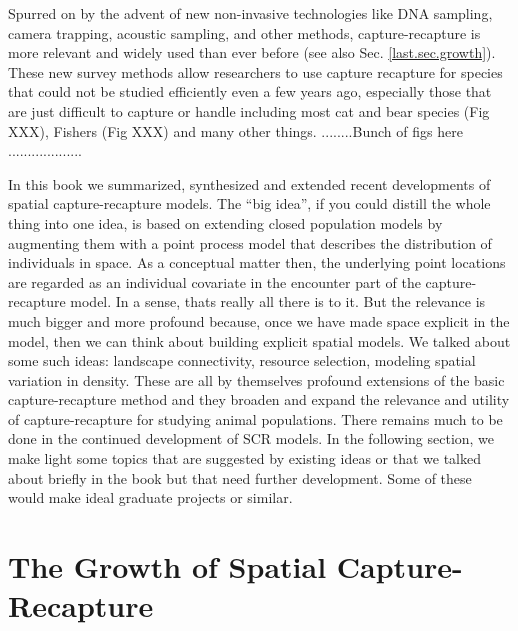 Spurred on by the advent of new non-invasive technologies like DNA
sampling, camera trapping, acoustic sampling, and other methods,
capture-recapture is more relevant and widely used than ever before
(see also Sec. \ref{last.sec.growth}).  These new survey methods allow
researchers to use capture recapture for species that could not be
studied efficiently even a few years ago, especially those that are
just difficult to capture or handle including most cat and bear
species (Fig XXX), Fishers (Fig XXX) and many other
things. ........Bunch of figs here ...................

In this book we summarized, synthesized and extended recent
developments of spatial capture-recapture models.  The ``big idea'',
if you could distill the whole thing into one idea, is based on
extending closed population models by augmenting them with a point
process model that describes the distribution of individuals
\citep{efford:2004} in space. As a conceptual matter then, the
underlying point locations are regarded as an individual covariate in
the encounter part of the capture-recapture model. In a sense, thats
really all there is to it. But the relevance is much bigger and more
profound because, once we have made space explicit in the model, then
we can think about building explicit spatial models.
We talked about some such ideas: landscape connectivity, resource
selection, modeling spatial variation in density. These are all by
themselves profound extensions of the basic capture-recapture method
and they broaden and expand the relevance and utility of
capture-recapture for studying animal populations.
There remains much to be done in the continued development of SCR
models. In the following section, we make light some topics that are
suggested by existing ideas or that we talked about briefly in the
book but that need further development. Some of these would make ideal
graduate projects or similar.


\section{The Growth of Spatial Capture-Recapture}

